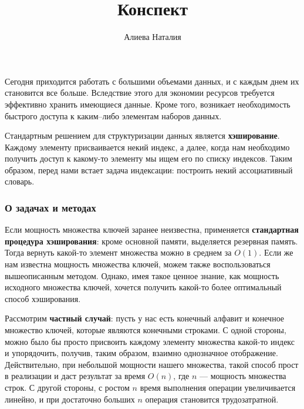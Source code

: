 \documentclass[specialist,
               substylefile = spbu.rtx,
               subf,href,colorlinks=true, 12pt]{disser}
\begin{document}


\title{Конспект}


\author{Алиева Наталия}


\date{\number\year}

\maketitle

\tableofcontents

\intro

Сегодня приходится работать с большими объемами данных, и с каждым днем их становится все больше. Вследствие этого  для экономии ресурсов требуется эффективно хранить имеющиеся данные. Кроме того, возникает необходимость быстрого доступа к каким--либо элементам наборов данных.

Стандартным решением для структуризации данных является \textbf{хэширование}. Каждому элементу присваивается некий индекс, а далее, когда нам необходимо получить доступ к какому-то элементу мы ищем его по списку индексов. Таким образом, перед нами встает задача индексации: построить некий ассоциативный словарь.

\subsubsection{О задачах и методах}

Если мощность множества ключей заранее неизвестна, применяется \textbf{стандартная процедура хэширования}: кроме основной памяти, выделяется резервная память. Тогда вернуть какой-то элемент множества можно в среднем за $\mathit{O}(1)$. Если же нам известна мощность множества ключей, можем также воспользоваться вышеописанным методом. Однако, имея такое ценное знание, как мощность исходного множества ключей, хочется получить какой-то более оптимальный способ хэширования.

Рассмотрим \textbf{частный случай}: пусть у нас есть конечный алфавит и конечное множество ключей, которые являются конечными строками. С одной стороны, можно было бы просто присвоить каждому элементу множества какой-то индекс и упорядочить, получив, таким образом, взаимно однозначное отображение. Действительно, при небольшой мощности нашего множества, такой способ прост в реализации и даст результат за время $\mathit{O}(n)$, где $n$ --- мощность множества строк. С другой стороны, с ростом $n$ время выполнения операции увеличивается линейно, и при достаточно больших $n$ операция становится трудозатратной.
\end{document}
